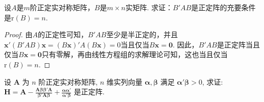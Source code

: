 \documentclass[../../main.tex]{subfiles}
\begin{document}
\begin{proposition}\label{proposition:第8章解答题6}
设\(A\)是\(m\)阶正定实对称矩阵，\(B\)是\(m\times n\)实矩阵. 求证：\(B'AB\)是正定阵的充要条件是\(\mathrm{r}(B)=n\).
\end{proposition}
\begin{proof}
由\(A\)的正定性可知，\(B'AB\)至少是半正定的，并且\(\boldsymbol{x}'(B'AB)\boldsymbol{x}=(B\boldsymbol{x})'A(B\boldsymbol{x}) = 0\)当且仅当\(B\boldsymbol{x}=\boldsymbol{0}\). 因此，\(B'AB\)是正定阵当且仅当\(B\boldsymbol{x}=\boldsymbol{0}\)只有零解，再由线性方程组的求解理论可知，这也当且仅当\(\mathrm{r}(B)=n\). 
\end{proof}

\begin{proposition}\label{proposition:A正定则H正定}
设 \(\boldsymbol{A}\) 为 \(n\) 阶正定实对称矩阵, \(n\) 维实列向量 \(\boldsymbol{\alpha},\boldsymbol{\beta}\) 满足 \(\boldsymbol{\alpha}'\boldsymbol{\beta}>0\), 求证: \(\boldsymbol{H}=\boldsymbol{A}-\frac{\boldsymbol{A}\boldsymbol{\beta}\boldsymbol{\beta}'\boldsymbol{A}}{\boldsymbol{\beta}'\boldsymbol{A}\boldsymbol{\beta}}+\frac{\boldsymbol{\alpha}\boldsymbol{\alpha}'}{\boldsymbol{\alpha}'\boldsymbol{\beta}}\) 是正定阵.
\end{proposition}
\end{document}
